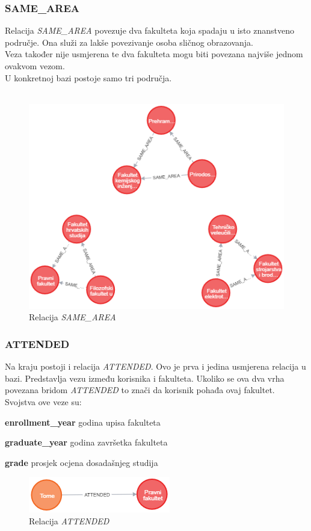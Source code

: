 \documentclass[titlepage, 12pt]{scrartcl}
\begin{document}
\subsubsection{SAME\_AREA}
Relacija \emph{SAME\_AREA} povezuje dva fakulteta koja spadaju u isto znanstveno područje. Ona služi za lakše povezivanje osoba sličnog obrazovanja. \\
Veza također nije usmjerena te dva fakulteta mogu biti povezana najviše jednom ovakvom vezom. \\
U konkretnoj bazi postoje samo tri područja.
\\ \\
\begin{figure}[h]
    \centering
    \includegraphics[scale=0.7]{slike/SAME_AREA.png}
    \caption{Relacija \emph{SAME\_AREA}}
    \label{fig:area}
\end{figure}

\subsubsection{ATTENDED}
Na kraju postoji i relacija \emph{ATTENDED}. Ovo je prva i jedina usmjerena relacija u bazi. Predstavlja vezu između korisnika i fakulteta. Ukoliko se ova dva vrha povezana bridom \emph{ATTENDED} to znači da korisnik pohađa ovaj fakultet. \\
Svojstva ove veze su:
\begin{itemize}
\begin{samepage}
    \item \textbf{enrollment\_year} godina upisa fakulteta
    \item \textbf{graduate\_year} godina završetka fakulteta
    \item \textbf{grade} prosjek ocjena dosadašnjeg studija
\end{samepage}
\end{itemize}
\begin{figure}[h]
    \centering
    \includegraphics[scale=0.7]{slike/ATTENDED.png}
    \caption{Relacija \emph{ATTENDED}}
    \label{fig:attendance}
\end{figure}
\newpage
\end{document}
